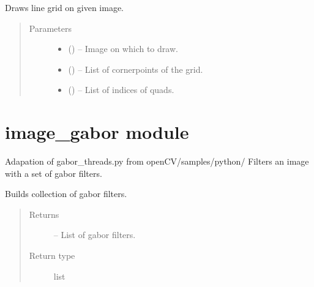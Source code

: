 \documentclass[letterpaper,10pt,english]{sphinxmanual}
\begin{document}
\begin{fulllineitems}
\label{\detokenize{image_draw_grid:image_draw_grid.draw_grid}}
Draws line grid on given image.
\begin{quote}\begin{description}
\item[{Parameters}] \leavevmode\begin{itemize}
\item {} 
 () -- Image on which to draw.

\item {} 
 () -- List of cornerpoints of the grid.

\item {} 
 () -- List of indices of quads.

\end{itemize}

\end{description}\end{quote}

\end{fulllineitems}



\chapter{image\_gabor module}
\label{\detokenize{image_gabor:image-gabor-module}}\label{\detokenize{image_gabor:module-image_gabor}}\label{\detokenize{image_gabor::doc}}
Adapation of gabor\_threads.py from openCV/samples/python/
Filters an image with a set of gabor filters.

\begin{fulllineitems}
\label{\detokenize{image_gabor:image_gabor.build_filters}}
Builds collection of gabor filters.
\begin{quote}\begin{description}
\item[{Returns}] \leavevmode
{} -- List of gabor filters.

\item[{Return type}] \leavevmode
list

\end{description}\end{quote}

\end{fulllineitems}
\end{document}
